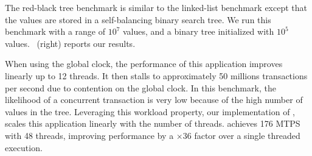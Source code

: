 The red-black tree benchmark is similar to the linked-list benchmark except that the values are stored in a self-balancing binary search tree. 
We run this benchmark with a range of $10^7$ values, and a binary tree initialized with $10^5$ values.
~(right) reports our results.

When using the global clock, the performance of this application improves linearly up to 12 threads. 
It then stalls to approximately 50 millions transactions per second due to contention on the global clock.
In this benchmark, the likelihood of a concurrent transaction is very low because of the high number of values in the tree.
Leveraging this workload property, our implementation of , scales this application linearly with the number of threads.
 achieves 176 MTPS with 48 threads, improving performance by a $\times 36$ factor over a single threaded execution.


